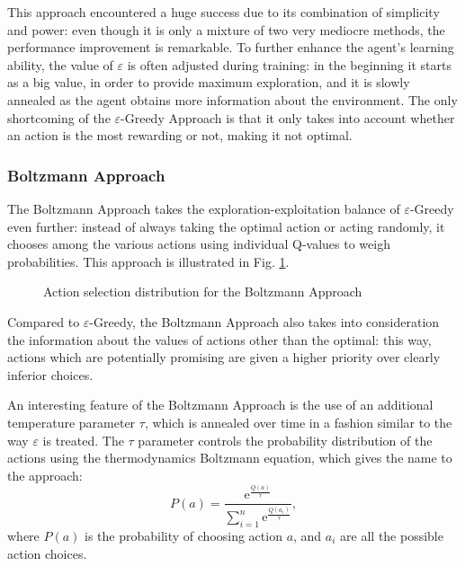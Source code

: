 \documentclass[a4paper, 12pt]{article}
\numberwithin{equation}{section}
\begin{document}
This approach encountered a huge success due to its combination of simplicity and power: even though it is only a mixture of two very mediocre methods, the performance improvement is remarkable. To further enhance the agent's learning ability, the value of $\varepsilon$ is often adjusted during training: in the beginning it starts as a big value, in order to provide maximum exploration, and it is slowly annealed as the agent obtains more information about the environment. The only shortcoming of the $\varepsilon$-Greedy Approach is that it only takes into account whether an action is the most rewarding or not, making it not optimal.


\subsubsection{Boltzmann Approach}

The Boltzmann Approach takes the exploration-exploitation balance of $\varepsilon$-Greedy even further: instead of always taking the optimal action or acting randomly, it chooses among the various actions using individual Q-values to weigh probabilities. This approach is illustrated in Fig. \ref{fig:boltzmann}.


\begin{figure}[h]
	\centering
		\caption{Action selection distribution for the Boltzmann Approach}
	\label{fig:boltzmann}
\end{figure}

Compared to $\varepsilon$-Greedy, the Boltzmann Approach also takes into consideration the information about the values of actions other than the optimal: this way, actions which are potentially promising are given a higher priority over clearly inferior choices.

An interesting feature of the Boltzmann Approach is the use of an additional temperature parameter $\tau$, which is annealed over time in a fashion similar to the way $\varepsilon$ is treated. The $\tau$ parameter controls the probability distribution of the actions using the thermodynamics Boltzmann equation, which gives the name to the approach:
\begin{equation}\label{eq:boltzmann}
	P\left(a\right) = \frac{\mathrm{e}^\frac{Q\left(a\right)}{\tau}}{\sum_{i=1}^n \mathrm{e}^\frac{Q\left(a_i\right)}{\tau}},
\end{equation}
where $P\left(a\right)$ is the probability of choosing action $a$, and $a_i$ are all the possible action choices.
\end{document}
